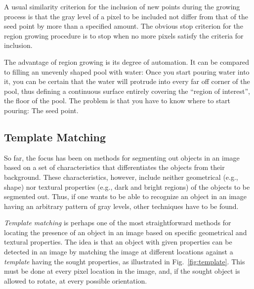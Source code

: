 A usual similarity criterion for the inclusion of new points during
the growing process is that the gray level of a pixel to be included
not differ from that of the seed point by more than a specified
amount.  The obvious stop criterion for the region growing procedure
is to stop when no more pixels satisfy the criteria for inclusion.

The advantage of region growing is its degree of automation.  It can
be compared to filling an unevenly shaped pool with water: Once you
start pouring water into it, you can be certain that the water will
protrude into every far off corner of the pool, thus defining a
continuous surface entirely covering the ``region of interest'', the
floor of the pool.  The problem is that you have to know where to
start pouring: The seed point.

\subsection{Template Matching}
\label{image:segment:template}

So far, the focus has been on methods for segmenting out objects in an
image based on a set of characteristics that differentiates the
objects from their background.  These characteristics, however,
include neither geometrical (e.g., shape) nor textural properties
(e.g., dark and bright regions) of the objects to be segmented out.
Thus, if one wants to be able to recognize an object in an image
having an arbitrary pattern of gray levels, other techniques have to
be found.

{\em Template matching\/} is perhaps one of the most straightforward
methods for locating the presence of an object in an image based on
specific geometrical and textural properties.  The idea is that an
object with given properties can be detected in an image by matching
the image at different locations against a {\em template\/} having the
sought properties, as illustrated in Fig.~\ref{fig:template}.  This
must be done at every pixel location in the image, and, if the sought
object is allowed to rotate, at every possible orientation.


